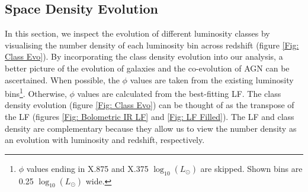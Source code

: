 \subsection{Space Density Evolution}
\label{Sec: Class Density}

In this section, we inspect the evolution of different luminosity classes by visualising the number density of each luminosity bin across redshift (figure \ref{Fig: Class Evo}). By incorporating the class density evolution into our analysis, a better picture of the evolution of galaxies and the co-evolution of AGN can be ascertained. When possible, the $\phi$ values are taken from the existing luminosity bins\footnote{$\phi$ values ending in X.875 and X.375 $\log_{10}(L_{\odot})$ are skipped. Shown bins are 0.25 $\log_{10}(L_{\odot})$ wide.}. Otherwise, $\phi$ values are calculated from the best-fitting LF. The class density evolution (figure \ref{Fig: Class Evo}) can be thought of as the transpose of the LF (figures \ref{Fig: Bolometric IR LF} and \ref{Fig: LF Filled}). The LF and class density are complementary because they allow us to view the number density as an evolution with luminosity and redshift, respectively. 

